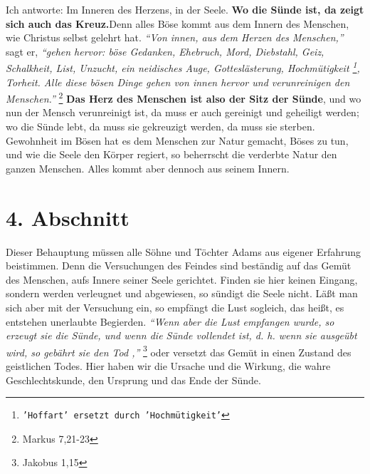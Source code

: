 \label{ref:03_03_ort_des_kreuzes}
Ich antworte: Im Inneren des Herzens, in der Seele. \textbf{Wo die Sünde ist,
da zeigt
sich auch das Kreuz.}Denn alles Böse kommt aus dem Innern des Menschen, wie
Christus selbst gelehrt hat.
\textit{"`Von innen, aus dem Herzen des Menschen,"'} sagt er,
\textit{"`gehen hervor: böse Gedanken, Ehebruch, Mord, Diebstahl, Geiz, Schalkheit,
List, Unzucht, ein neidisches Auge, Gotteslästerung,
Hochmütigkeit
\footnote{\texttt{'Hoffart' ersetzt durch 'Hochmütigkeit'}},
Torheit. Alle
diese bösen Dinge gehen von innen hervor und verunreinigen den
Menschen."'}
\footnote{Markus 7,21-23}
\textbf{Das Herz des Menschen ist also der Sitz der Sünde},
 und wo nun der Mensch
verunreinigt ist, da muss er auch gereinigt und
geheiligt werden; wo die Sünde lebt, da muss sie gekreuzigt werden, da muss sie
sterben. Gewohnheit im Bösen hat es dem Menschen zur Natur gemacht, Böses zu
tun, und wie die Seele den Körper regiert, so beherrscht die verderbte Natur
den ganzen Menschen. Alles kommt aber dennoch aus seinem Innern.

\section{4. Abschnitt} \label{kap3_ab4}

Dieser Behauptung müssen alle Söhne und Töchter Adams aus eigener Erfahrung
beistimmen. Denn die Versuchungen des Feindes sind beständig auf das Gemüt des
Menschen, aufs Innere seiner Seele gerichtet. Finden sie hier keinen Eingang,
sondern werden verleugnet und abgewiesen, so sündigt die Seele nicht. Läßt man
sich aber mit der Versuchung ein, so empfängt die Lust sogleich, das heißt, es
entstehen unerlaubte Begierden.
\textit{"`Wenn aber die Lust empfangen wurde, so erzeugt
sie die Sünde, und wenn die Sünde vollendet ist, d. h. wenn sie ausgeübt wird,
so gebährt sie den Tod ,"'}
\footnote{Jakobus 1,15}
oder versetzt das Gemüt in einen
Zustand des geistlichen Todes. Hier haben wir die
Ursache und die Wirkung, die
wahre Geschlechtskunde, den Ursprung und das Ende der Sünde.

\medskip

